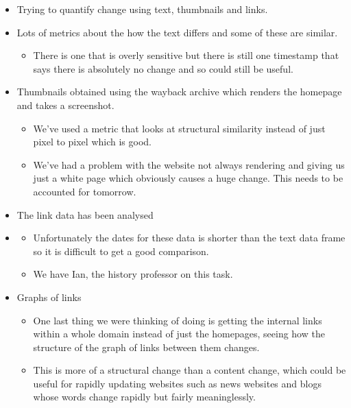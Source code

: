 \documentclass[10pt]{beamer}
\begin{document}
\begin{frame}

\begin{itemize}
\item Trying to quantify change using text, thumbnails and links.
\item Lots of metrics about the how the text differs and some of these are similar.
\begin{itemize}
\item There is one that is overly sensitive but there is still one timestamp that says there is absolutely no change and so could still be useful.
\end{itemize}  
\item Thumbnails obtained using the wayback archive which renders the homepage and takes a screenshot.
\begin{itemize}
\item We've used a metric that looks at structural similarity instead of just pixel to pixel which is good. 
\item We've had a problem with the website not always rendering and giving us just a white page which obviously causes a huge change. This needs to be accounted for tomorrow.
\end{itemize}
\end{itemize}
\end{frame}

\begin{frame}
\begin{itemize}
\item The link data has been analysed
\item \begin{itemize}
\item Unfortunately the dates for these data is shorter than the text data frame so it is difficult to get a good comparison. 
\item We have Ian, the history professor on this task.
\end{itemize}
\item Graphs of links
\begin{itemize}
\item One last thing we were thinking of doing is getting the internal links within a whole domain instead of just the homepages, seeing how the structure of the graph of links between them changes.
\item This is more of a structural change than a content change, which could be useful for rapidly updating websites such as news websites and blogs whose words change rapidly but fairly meaninglessly.
\end{itemize}
\end{itemize}

\end{frame}
\end{document}
